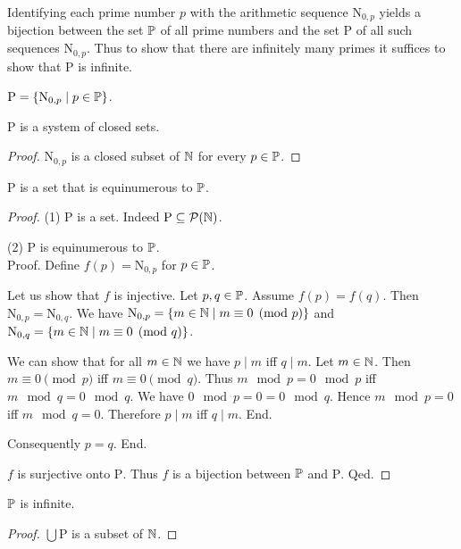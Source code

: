 \documentclass{article}
\newcommand{\N}{\mathrm{N}}
\newcommand{\Ps}{\mathrm{P}}
\begin{document}
  Identifying each prime number $p$ with the arithmetic sequence $\N_{0, p}$
  yields a bijection between the set $\mathbb{P}$ of all prime numbers and the set
  $\Ps$ of all such sequences $\N_{0, p}$.
  Thus to show that there are infinitely many primes it suffices to show that
  $\Ps$ is infinite.

  \begin{forthel}
    \begin{definition}
      $\Ps = \{ \N_{0, p} \mid p \in \Prime \}$.
    \end{definition}

    \begin{lemma}
      $\Ps$ is a system of closed sets.
    \end{lemma}
    \begin{proof}
      $\N_{0, p}$ is a closed subset of $\mathbb{N}$ for every $p \in \mathbb{P}$.
    \end{proof}

    \begin{lemma}
      $\Ps$ is a set that is equinumerous to $\mathbb{P}$.
    \end{lemma}
    \begin{proof}
      (1) $\Ps$ is a set.
      Indeed $\Ps \subseteq \pow(\Nat)$.

      (2) $\Ps$ is equinumerous to $\mathbb{P}$. \\
      Proof.
        Define $f(p) = \N_{0,p}$ for $p \in \mathbb{P}$.

        Let us show that $f$ is injective.
          Let $p, q \in \mathbb{P}$.
          Assume $f(p) = f(q)$.
          Then $\N_{0, p} = \N_{0, q}$.
          We have $\N_{0, p} = \{ m \in \Nat \mid m \equiv 0 \pmod{p} \}$ and
          $\N_{0, q} = \{ m \in \Nat \mid m \equiv 0 \pmod{q} \}$.

          We can show that for all $m \in \mathbb{N}$ we have $p \mid m$ iff $q \mid m$.
            Let $m \in \mathbb{N}$.
            Then $m \equiv 0 \pmod{p}$ iff $m \equiv 0 \pmod{q}$.
            Thus $m \mod p = 0 \mod p$ iff $m \mod q = 0 \mod q$.
            We have $0 \mod p = 0 = 0 \mod q$.
            Hence $m \mod p = 0$ iff $m \mod q = 0$.
            Therefore $p \mid m$ iff $q \mid m$.
          End.

          Consequently $p = q$.
        End.

        $f$ is surjective onto $\Ps$.
        Thus $f$ is a bijection between $\mathbb{P}$ and $\Ps$.
      Qed.
    \end{proof}

    \begin{theorem}[Furstenberg]
      $\mathbb{P}$ is infinite.
    \end{theorem}
    \begin{proof}
      $\bigcup \Ps$ is a subset of $\mathbb{N}$.


\end{proof}
\end{forthel}
\end{document}
